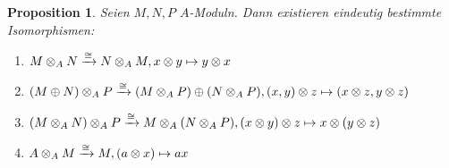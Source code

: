 \documentclass[12pt,a4paper]{scrartcl}
\theoremstyle{cplain}
\newtheorem{prop}[thmcounter]{Proposition}
\theoremstyle{cdef}
\begin{document}
\begin{prop}
	Seien $M,N,P$ $A$-Moduln. Dann existieren eindeutig bestimmte Isomorphismen:
	\begin{enumerate}
		\item $M \otimes_A N \xrightarrow{\cong} N \otimes_A M, x \otimes y \mapsto y \otimes x$ \label{prop:tensorisos:i}
		\item $(M \oplus N) \otimes_A P \xrightarrow{\cong} (M \otimes_A P) \oplus (N \otimes_A P), (x,y)\otimes z  \mapsto (x \otimes z,y\otimes z)$ \label{prop:tensorisos:ii}
		\item $(M \otimes_A N) \otimes_A P \xrightarrow{\cong} M \otimes_A (N \otimes_A P), (x \otimes y) \otimes z \mapsto x \otimes (y \otimes z)$ \label{prop:tensorisos:iii}
		\item $A \otimes_A M \xrightarrow{\cong} M, (a \otimes x) \mapsto ax$ \label{prop:tensorisos:iv}
	\end{enumerate}
\end{prop}

\end{document}
